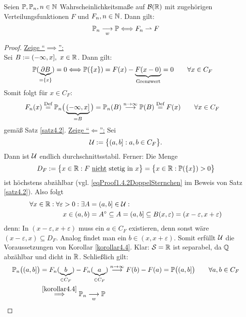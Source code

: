 \begin{korollar}\label{korollar4.5}
	Seien $\P,\P_n,n\in\N$ Wahrscheinlichkeitsmaße auf $\B(\R)$ mit zugehörigen Verteilungsfunktionen $F$ und $F_n,n\in\N$. 
	Dann gilt:
	\begin{align*}
		\P_n\stackrelnew{w}{}{\longrightarrow}\P
		\Longleftrightarrow
		F_n\rightharpoonup F
	\end{align*}
\end{korollar}

\begin{proof}
	\underline{Zeige ``$\implies$'':}\\
	Sei $B:=(-\infty,x],~x\in\R$. 
	Dann gilt:
	\begin{align*}
		\P(\underbrace{\partial B}_{=\lbrace x\rbrace})=0
		&\Longleftrightarrow \P(\lbrace x\rbrace)=F(x)-\underbrace{F(x-0)}_{\text{Grenzwert}}=0
		\qquad\forall x\in C_F
	\end{align*}
	Somit folgt für $x\in C_F$:
	\begin{align*}
		F_n(x)&\stackeq{\text{Def}}
		\P_n\big(\underbrace{(-\infty,x]}_{=B}\big)=\P_n(B)\stackrel{n\to\infty}{\longrightarrow} \P(B)\stackeq{\text{Def}} F(x)\qquad\forall x\in C_F
	\end{align*}
	gemäß Satz \ref{satz4.2}.\nl
	\underline{Zeige ``$\Longleftarrow$'':} Sei
	\begin{align*}
		\U:=\big\lbrace (a,b]:a,b\in C_F\big\rbrace.
	\end{align*}
	Dann ist $\U$ endlich durchschnittsstabil. Ferner: Die Menge 
	\begin{align*}
		D_F:=\big\lbrace x\in\R: F\text{ \underline{nicht} stetig in }x\big\rbrace
		=\big\lbrace x\in\R:\P(\lbrace x\rbrace)>0\big\rbrace
	\end{align*}
	ist höchstens abzählbar (vgl. \eqref{eqProof1.4.2DoppelSternchen} 
	im Beweis von Satz \ref{satz4.2}). Also folgt
	\begin{align*}
		\forall x\in\R:\forall\varepsilon>0:\exists A&=(a,b]\in\U:\\
		x\in (a,b)&=A^\circ\subseteq A=(a,b]\subseteq B(x,\varepsilon)=(x-\varepsilon,x+\varepsilon)
	\end{align*}
	denn: 
	In $(x-\varepsilon,x+\varepsilon)$ muss ein $a\in C_F$ existieren, denn sonst wäre $(x-\varepsilon, x)\subseteq D_F$. 
	Analog findet man ein $b\in(x,x+\varepsilon)$. 
	Somit erfüllt $\U$ die Voraussetzungen von Korollar \ref{korollar4.4}. 
	Klar: $\S=\R$ ist separabel, da $\Q$ abzählbar und dicht in $\R$. 
	Schließlich gilt:
	\begin{align*}
		\P_n\big((a,b]\big)&=
		F_n(\underbrace{b}_{\in C_F})-F_n(\underbrace{a}_{\in C_F})\stackrel{n\to\infty}{\longrightarrow} F(b)-F(a)
		=\P\big((a,b]\big)\qquad\forall a,b\in C_F\\
		&\stackrel{\ref{korollar4.4}}{\implies}
		\P_n\stackrelnew{w}{}{\longrightarrow} \P
	\end{align*}
\end{proof}

